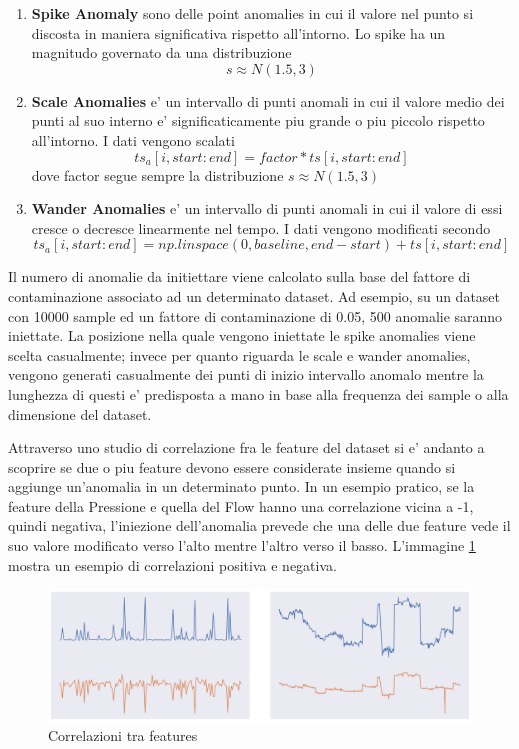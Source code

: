 \begin{enumerate}
	\item \textbf{Spike Anomaly} sono delle point anomalies in cui il valore nel punto si discosta in maniera significativa rispetto all'intorno. Lo spike ha un magnitudo governato da una distribuzione \[s \approx N(1.5, 3) \]
	\item \textbf{Scale Anomalies} e' un intervallo di punti anomali in cui il  valore medio dei punti al suo interno e' significaticamente piu grande o piu piccolo rispetto all'intorno. I dati vengono scalati \[ ts_a[i, start:end] = factor*ts[i, start:end]\] dove factor segue sempre la distribuzione \(s \approx N(1.5, 3) \)
	\item \textbf{Wander Anomalies} e' un intervallo di punti anomali in cui il valore di essi cresce o decresce linearmente nel tempo. I dati vengono modificati secondo \[ ts_a[i, start:end] = np.linspace(0, baseline, end-start) + ts[i, start:end] \] 
\end{enumerate}

Il numero di anomalie da initiettare viene calcolato sulla base del fattore di contaminazione associato ad un determinato dataset. Ad esempio, su un dataset con 10000 sample ed un fattore di contaminazione di 0.05, 500 anomalie saranno iniettate.
La posizione nella quale vengono iniettate le spike anomalies viene scelta casualmente; invece per quanto riguarda le scale e wander anomalies, vengono generati casualmente dei punti di inizio intervallo anomalo mentre la lunghezza di questi e' predisposta a mano in base alla frequenza dei sample o alla dimensione del dataset.

Attraverso uno studio di correlazione fra le feature del dataset si e' andanto a scoprire se due o piu feature devono essere considerate insieme quando si aggiunge un'anomalia in un determinato punto. In un esempio pratico, se la feature della Pressione e quella del Flow hanno una correlazione vicina a -1, quindi negativa, l'iniezione dell'anomalia prevede che una delle due feature vede il suo valore modificato verso l'alto mentre l'altro verso il basso. L'immagine \ref{feature-correlazioni} mostra un esempio di correlazioni positiva e negativa.
\begin{figure}[t]
	\centering
	\includegraphics[width=14cm, scale=1]{images/corr}
	\caption{Correlazioni tra features}
	\label{feature-correlazioni}
		
\end{figure}

